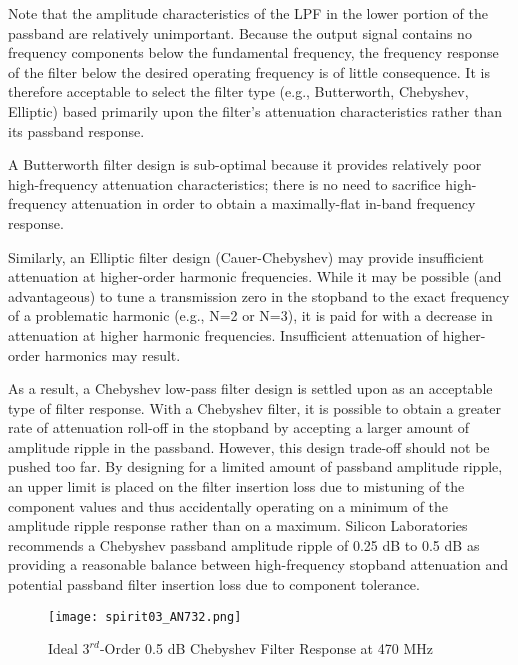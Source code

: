         Note that the amplitude characteristics of the LPF in the lower portion of the passband are 
        relatively unimportant. Because the output signal contains no frequency components below 
        the fundamental frequency, the frequency response of the filter below the desired operating 
        frequency is of little consequence. It is therefore acceptable to select the filter type 
        (e.g., Butterworth, Chebyshev, Elliptic) based primarily upon the filter’s attenuation 
        characteristics rather than its passband response.
        
        A Butterworth filter design is sub-optimal because it provides relatively poor 
        high-frequency attenuation characteristics; there is no need to sacrifice high-frequency 
        attenuation in order to obtain a maximally-flat in-band frequency response.
        
        Similarly, an Elliptic filter design (Cauer-Chebyshev) may provide insufficient attenuation 
        at higher-order harmonic frequencies. While it may be possible (and advantageous) to tune a 
        transmission zero in the stopband to the exact frequency of a problematic harmonic (e.g., 
        N=2 or N=3), it is paid for with a decrease in attenuation at higher harmonic frequencies. 
        Insufficient attenuation of higher-order harmonics may result.
        
        As a result, a Chebyshev low-pass filter design is settled upon as an acceptable type of 
        filter response. With a Chebyshev filter, it is possible to obtain a greater rate of 
        attenuation roll-off in the stopband by accepting a larger amount of amplitude ripple in 
        the passband. However, this design trade-off should not be pushed too far. By designing for 
        a limited amount of passband amplitude ripple, an upper limit is placed on the filter 
        insertion loss due to mistuning of the component values and thus accidentally operating on 
        a minimum of the amplitude ripple response rather than on a maximum. Silicon Laboratories 
        recommends a Chebyshev passband amplitude ripple of 0.25 dB to 0.5 dB as providing a 
        reasonable balance between high-frequency stopband attenuation and potential passband 
        filter insertion loss due to component tolerance.
       
        \begin{figure}[ht!]  %
          \centering
          \texttt{[image: spirit03\_AN732.png]}
          \caption{Ideal \(3^{rd}\)-Order 0.5 dB Chebyshev Filter Response at 470 MHz 
                   \cite[s.~18]{AN648SiliconLabs}}
          \label{EXP001:fig_spirit03}
        \end{figure} 
        
